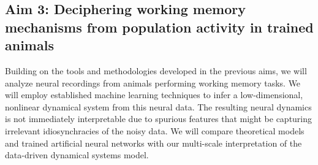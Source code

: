 \documentclass[12pt,letterpaper, onecolumn]{article}
\theoremstyle{definition}
\theoremstyle{remark}
\begin{document}
\subsection*{Aim 3: Deciphering working memory mechanisms from population activity in trained animals}
Building on the tools and methodologies developed in the previous aims, we will analyze neural recordings from animals performing working memory tasks.
We will employ established machine learning techniques to infer a low-dimensional, nonlinear dynamical system from this neural data.
The resulting neural dynamics is not immediately interpretable due to spurious features that might be capturing irrelevant idiosynchracies of the noisy data.
We will compare theoretical models and trained artificial neural networks with our multi-scale interpretation of the data-driven dynamical systems model.
\end{document}
